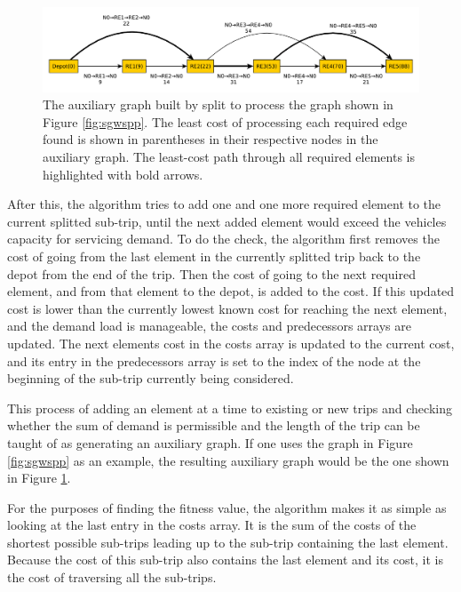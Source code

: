 \begin{figure}[thbp]
    \centerline{\includegraphics[width=\textwidth]{figures/SplitIllustrations/Split_AuxiliaryGraph.pdf}}
    \caption{The auxiliary graph built by split to process the graph shown in Figure \ref{fig:sgwspp}. The least cost of processing each required edge found is shown in parentheses in their respective nodes in the auxiliary graph. The least-cost path through all required elements is highlighted with bold arrows.}
    \label{fig:sag}
\end{figure}

After this, the algorithm tries to add one and one more required element to the current splitted sub-trip, until the next added element would exceed the vehicles capacity for servicing demand. To do the check, the algorithm first removes the cost of going from the last element in the currently splitted trip back to the depot from the end of the trip. Then the cost of going to the next required element, and from that element to the depot, is added to the cost. If this updated cost is lower than the currently lowest known cost for reaching the next element, and the demand load is manageable, the costs and predecessors arrays are updated. The next elements cost in the costs array is updated to the current cost, and its entry in the predecessors array is set to the index of the node at the beginning of the sub-trip currently being considered.

This process of adding an element at a time to existing or new trips and checking whether the sum of demand is permissible and the length of the trip can be taught of as generating an auxiliary graph. If one uses the graph in Figure \ref{fig:sgwspp} as an example, the resulting auxiliary graph would be the one shown in Figure \ref{fig:sag}.

For the purposes of finding the fitness value, the algorithm makes it as simple as looking at the last entry in the costs array. It is the sum of the costs of the shortest possible sub-trips leading up to the sub-trip containing the last element. Because the cost of this sub-trip also contains the last element and its cost, it is the cost of traversing all the sub-trips.

